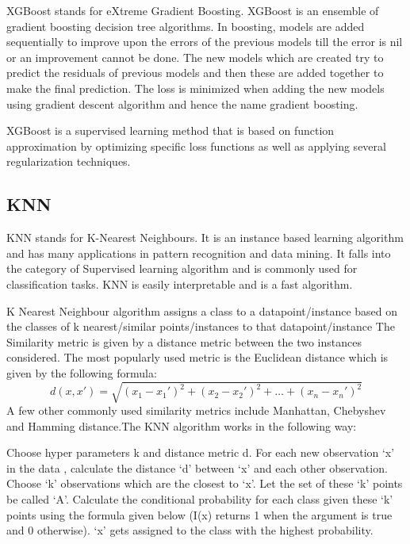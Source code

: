 \documentclass[preprint,12pt]{elsarticle}
\begin{document}
XGBoost stands for eXtreme Gradient Boosting. XGBoost is an ensemble of gradient boosting decision tree algorithms.  In boosting, models are added sequentially to improve upon the errors of the previous models till the error is nil or an improvement cannot be done. The new models which are created try to predict the residuals of previous models and then these are added together to make the final prediction. The loss is minimized when adding the new models using gradient descent algorithm  and hence the name gradient boosting. 

XGBoost is a supervised learning method that is based on function approximation by optimizing specific loss functions as well as applying several regularization techniques.

\subsection{KNN}

KNN stands for K-Nearest Neighbours. It is an instance based learning algorithm and has many applications in pattern recognition and data mining. It falls into the category of Supervised learning algorithm and is commonly used for classification tasks. KNN is easily interpretable and is a fast algorithm.

K Nearest Neighbour algorithm assigns a class to a datapoint/instance based on the classes of k nearest/similar points/instances to that datapoint/instance The Similarity metric is given by a distance metric between the two instances considered. The most popularly used metric is the Euclidean distance which is given by the following formula:
\begin{equation}
d(x,x') = \sqrt{ {{(x_1 - x_1')}^2} + {{(x_2 - x_2')}^2} + \ldots + {{(x_n - x_n')}^2} }
\end{equation}
A few other commonly used similarity metrics include Manhattan, Chebyshev and Hamming distance.The KNN algorithm works in the following way:

Choose hyper parameters k and distance metric d. For each new observation ‘x’  in the data , calculate the distance ‘d’ between ‘x’ and each other observation. Choose ‘k’ observations which are the closest to ‘x’. Let the set of these ‘k’ points be called ‘A’. Calculate the conditional probability for each class given these ‘k’ points using the formula given below (I(x) returns 1 when the argument is true and 0 otherwise). ‘x’  gets assigned to the class with the highest probability.
\end{document}
